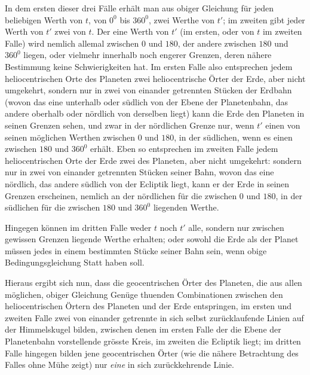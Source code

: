 In dem ersten dieser drei Fälle erhält man aus obiger Gleichung für jeden
beliebigen Werth von $t$, von $0^0$ bis $360^0$, zwei Werthe von $t'$; im zweiten gibt
jeder Werth von $t'$ zwei von $t$. Der eine Werth von $t'$ (im ersten, oder von $t$
im zweiten Falle) wird nemlich allemal zwischen $0$ und $180$, der andere zwischen
$180$ und $360^0$ liegen, oder vielmehr innerhalb noch engerer Grenzen, deren
nähere Bestimmung keine Schwierigkeiten hat. Im ersten Falle also entsprechen
jedem heliocentrischen Orte des Planeten zwei heliocentrische Örter
der Erde, aber nicht umgekehrt, sondern nur in zwei von einander getrennten
Stücken der Erdbahn (wovon das eine unterhalb oder südlich von der Ebene der
Planetenbahn, das andere oberhalb oder nördlich von derselben liegt) kann die
Erde den Planeten in seinen Grenzen sehen, und zwar in der nördlichen Grenze
nur, wenn $t'$ einen von seinen möglichen Werthen zwischen $0$ und $180$, in der
südlichen, wenn es einen zwischen $180$ und $360^0$ erhält. Eben so entsprechen
im zweiten Falle jedem heliocentrischen Orte der Erde zwei des Planeten, aber
nicht umgekehrt: sondern nur in zwei von einander getrennten Stücken seiner
Bahn, wovon das eine nördlich, das andere südlich von der Ecliptik liegt, kann
er der Erde in seinen Grenzen erscheinen, nemlich an der nördlichen für die zwischen
$0$ und $180$, in der südlichen für die zwischen $180$ und $360^0$ liegenden
Werthe.

Hingegen können im dritten Falle weder $t$ noch $t'$ alle, sondern nur zwischen
gewissen Grenzen liegende Werthe erhalten; oder sowohl die Erde als der
Planet müssen jedes in einem bestimmten Stücke seiner Bahn sein, wenn obige
Bedingungsgleichung Statt haben soll.

Hieraus ergibt sich nun, dass die geocentrischen Örter des Planeten, die
aus allen möglichen, obiger Gleichung Genüge thuenden Combinationen zwischen
den heliocentrischen Örtern des Planeten und der Erde entspringen, im ersten
und zweiten Falle zwei von einander getrennte in sich selbst zurücklaufende Linien
auf der Himmelskugel bilden, zwischen denen im ersten Falle der die Ebene
der Planetenbahn vorstellende grösste Kreis, im zweiten die Ecliptik liegt; im
%
dritten Falle hingegen bilden jene geocentrischen Örter (wie die nähere Betrachtung
des Falles ohne Mühe zeigt) nur \textit{eine} in sich zurückkehrende Linie.

